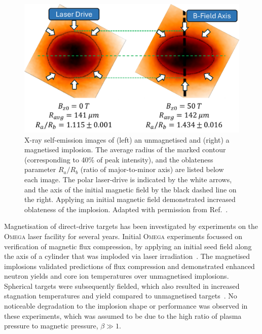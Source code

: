 \begin{figure}[t!]
    \includegraphics[width=0.6\linewidth]{Results2/Images/MagP2_Bose.png}
    \centering
    \caption{X-ray self-emission images of (left) an unmagnetised and (right) a magnetised implosion.
    The average radius of the marked contour (corresponding to 40\% of peak intensity), and the oblateness parameter $R_a/R_b$ (ratio of major-to-minor axis) are listed below each image.
    The polar laser-drive is indicated by the white arrows, and the axis of the initial magnetic field by the black dashed line on the right.
    Applying an initial magnetic field demonstrated increased oblateness of the implosion.
    Adapted with permission from Ref.~\cite{bose_effect_2022}.}%
    \label{fig:Res2_Bose_magp2}
\end{figure}

Magnetisation of direct-drive targets has been investigated by experiments on the \textsc{Omega} laser facility for several years.
Initial \textsc{Omega} experiments focussed on verification of magnetic flux compression, by applying an initial seed field along the axis of a cylinder that was imploded via laser irradiation~\cite{gotchev_laserdriven_2009}.
The magnetised implosions validated predictions of flux compression and demonstrated enhanced neutron yields and core ion temperatures over unmagnetised implosions.
Spherical targets were subsequently fielded, which also resulted in increased stagnation temperatures and yield compared to unmagnetised targets~\cite{chang_fusion_2011,hohenberger_inertial_2012}.
No noticeable degradation to the implosion shape or performance was observed in these experiments, which was assumed to be due to the high ratio of plasma pressure to magnetic pressure, $\beta\gg 1$.

